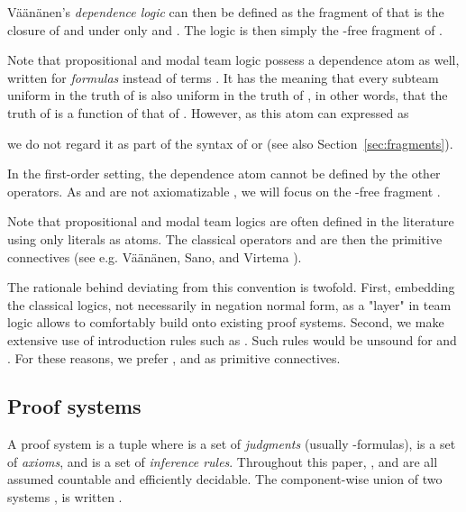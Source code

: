 \documentclass[a4paper,english,fleqn,11pt,final]{scrartcl}
\makeatletter
\newcommand{\eg}{e.g.\@\xspace}
\theoremstyle{plain}
\theoremstyle{definition}
\makeatother
\begin{document}
\smallskip

Väänänen's \emph{dependence logic}  can then be defined as the fragment of  that is the closure of  and  under only  and  \cite{vaananen_dependence_2007}.
The logic  is then simply the -free fragment of .

\smallskip

Note that propositional and modal team logic possess a dependence atom as well, written  for \emph{formulas}  instead of terms \cite{yang_propositional_2016,emdl,vaananen_modal_2008}.
It has the meaning that every subteam uniform in the truth of  is also uniform in the truth of , in other words, that the truth of  is a function of that of .
However, as this atom can expressed as

we do not regard it as part of the syntax of  or  (see also Section~\ref{sec:fragments}).

\smallskip

In the first-order setting, the dependence atom cannot be defined by the other operators.
As  and  are not axiomatizable \cite{vaananen_dependence_2007}, we will focus on the -free fragment .

\smallskip

Note that propositional and modal team logics are often defined in the literature using only literals  as atoms.
The classical operators  and  are then the primitive connectives (see \eg Väänänen, Sano, and Virtema \cite{sano_et_al,vaananen_modal_2008,vaananen_dependence_2007}).

The rationale behind deviating from this convention is twofold.
First, embedding the classical logics, not necessarily in negation normal form, as a "layer" in team logic allows to comfortably build onto existing proof systems.
Second, we make extensive use of introduction rules such as .
Such rules would be unsound for  and .
For these reasons, we prefer ,  and  as primitive connectives.





\subsection{Proof systems}

A proof system is a tuple  where  is a set of \emph{judgments} (usually -formulas),  is a set of \emph{axioms}, and  is a set of \emph{inference rules}.
Throughout this paper, ,  and  are all assumed countable and efficiently decidable.
The component-wise union of two systems ,  is written .
\end{document}
